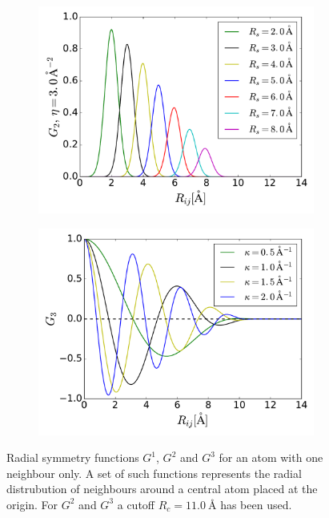 \documentclass[twoside,english]{uiofysmaster}
\begin{document}
\begin{figure}[H]
\begin{subfigure}[b]{0.5\linewidth}
    \centering
    \includegraphics[width=\linewidth]{Figures/Theory/G2_2.pdf} 
    \label{fig:radialSymmetriFunctions:c} 
  \end{subfigure}%
  \begin{subfigure}[b]{0.5\linewidth}
    \centering
    \includegraphics[width=\linewidth]{Figures/Theory/G3.pdf} 
    \label{fig:radialSymmetriFunctions:d} 
  \end{subfigure} 
  \caption{Radial symmetry functions $G^1$, $G^2$ and $G^3$ for an atom with one neighbour only. A set of such 
	   functions represents the radial distrubution of neighbours around a central atom placed at the origin.
	   For $G^2$ and $G^3$ a cutoff $R_c = \SI{11.0}{\angstrom}$ has been used.}
  \label{fig:radialSymmetriFunctions} 
\end{figure}
\end{document}
